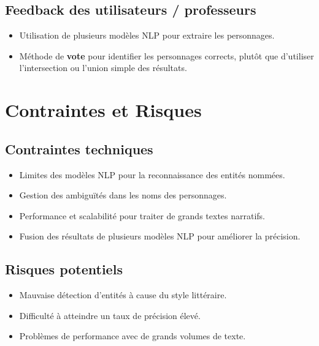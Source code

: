 \documentclass[12pt,a4paper]{article}
\begin{document}
\subsection{Feedback des utilisateurs / professeurs}

\begin{itemize}
    \item Utilisation de plusieurs modèles NLP pour extraire les personnages.
    \item Méthode de \textbf{vote} pour identifier les personnages corrects, plutôt que d'utiliser l'intersection ou l'union simple des résultats.
\end{itemize}

\section{Contraintes et Risques}

\subsection{Contraintes techniques}

\begin{itemize}
    \item Limites des modèles NLP pour la reconnaissance des entités nommées.
    \item Gestion des ambiguïtés dans les noms des personnages.
    \item Performance et scalabilité pour traiter de grands textes narratifs.
    \item Fusion des résultats de plusieurs modèles NLP pour améliorer la précision.
\end{itemize}

\subsection{Risques potentiels}

\begin{itemize}
    \item Mauvaise détection d'entités à cause du style littéraire.
    \item Difficulté à atteindre un taux de précision élevé.
    \item Problèmes de performance avec de grands volumes de texte.
\end{itemize}
\end{document}
